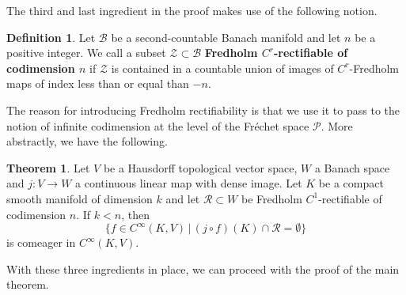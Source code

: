 \documentclass[11pt,a4paper]{article}
\theoremstyle{definition}
\newtheorem{definition}[theorem]{Definition}
\newtheorem{ingredient}{Theorem}
\newcommand{\cP}{\mathcal{P}}
\newcommand{\cR}{\mathcal{R}}
\newcommand{\cB}{\mathcal{B}}
\newcommand{\cZ}{\mathcal{Z}}
\begin{document}
The third and last ingredient in the proof makes use of the following notion.

\begin{definition}\label{Banach rectifiability}
    Let $\cB$ be a second-countable Banach manifold and let $n$ be a positive integer. We call a subset $\cZ \subset \cB$ \textbf{Fredholm $C^r$-rectifiable of codimension $n$} if $\cZ$ is contained in a countable union of images of $C^r$-Fredholm maps of index less than or equal than $-n$.
\end{definition}

The reason for introducing Fredholm rectifiability is that we use it to pass to the notion of infinite codimension at the level of the Fréchet space $\cP$. More abstractly, we have the following.

\begin{ingredient}\label{thm:C}
    Let $V$ be a Hausdorff topological vector space, $W$ a Banach space and $j: V \to W$ a continuous linear map with dense image. Let $K$ be a compact smooth manifold of dimension $k$ and let $\cR \subset W$ be Fredholm $C^1$-rectifiable of codimension $n$. If $k<n$, then 
    \begin{equation*}
        \{ f \in C^\infty(K, V) \, | \, (j\circ f)(K) \cap \cR = \emptyset \}
    \end{equation*} 
    is comeager in $C^\infty(K, V)$.
\end{ingredient}

With these three ingredients in place, we can proceed with the proof of the main theorem.
\end{document}
